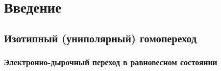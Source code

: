 


\def\labauthors{12345}
\def\labgroup{12345}
\def\labnumber{12345}
\def\labtheme{12345}
\renewcommand{\vec}{\mathbf}
\renewcommand{\phi}{\varphi}
\renewcommand{\hat}{\widehat}



\section{Введение}
\subsection{Изотипный (униполярный) гомопереход}
\subsubsection{Электронно-дырочный переход в равновесном состоянии}


